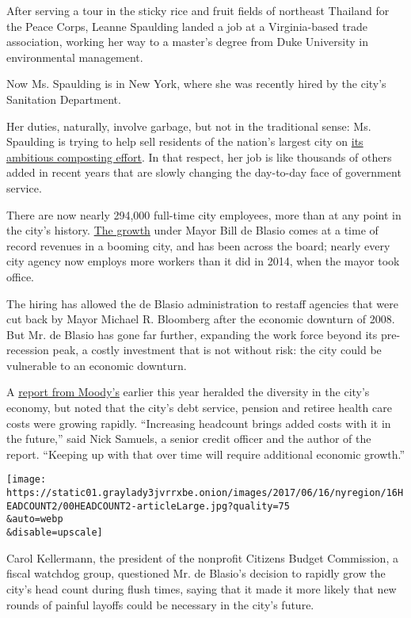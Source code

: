 After serving a tour in the sticky rice and fruit fields of northeast
Thailand for the Peace Corps, Leanne Spaulding landed a job at a
Virginia-based trade association, working her way to a master's degree
from Duke University in environmental management.

Now Ms. Spaulding is in New York, where she was recently hired by the
city's Sanitation Department.

Her duties, naturally, involve garbage, but not in the traditional
sense: Ms. Spaulding is trying to help sell residents of the nation's
largest city on
\href{https://www.nytimes3xbfgragh.onion/2017/06/02/nyregion/compost-organic-recycling-new-york-city.html}{its
ambitious composting effort}. In that respect, her job is like thousands
of others added in recent years that are slowly changing the day-to-day
face of government service.

There are now nearly 294,000 full-time city employees, more than at any
point in the city's history.
\href{https://www.nytimes3xbfgragh.onion/2016/10/12/nyregion/bill-de-blasio-government-jobs.html}{The
growth} under Mayor Bill de Blasio comes at a time of record revenues in
a booming city, and has been across the board; nearly every city agency
now employs more workers than it did in 2014, when the mayor took
office.

The hiring has allowed the de Blasio administration to restaff agencies
that were cut back by Mayor Michael R. Bloomberg after the economic
downturn of 2008. But Mr. de Blasio has gone far further, expanding the
work force beyond its pre-recession peak, a costly investment that is
not without risk: the city could be vulnerable to an economic downturn.

A
\href{https://www.moodys.com/research/Moodys-New-York-Citys-robust-and-diverse-economy-drives-growth--PR_361053}{report
from Moody's} earlier this year heralded the diversity in the city's
economy, but noted that the city's debt service, pension and retiree
health care costs were growing rapidly. ``Increasing headcount brings
added costs with it in the future,'' said Nick Samuels, a senior credit
officer and the author of the report. ``Keeping up with that over time
will require additional economic growth.''

\texttt{[image: https://static01.graylady3jvrrxbe.onion/images/2017/06/16/nyregion/16HEADCOUNT2/00HEADCOUNT2-articleLarge.jpg?quality=75\\\&auto=webp\\\&disable=upscale]}

Carol Kellermann, the president of the nonprofit Citizens Budget
Commission, a fiscal watchdog group, questioned Mr. de Blasio's decision
to rapidly grow the city's head count during flush times, saying that it
made it more likely that new rounds of painful layoffs could be
necessary in the city's future.

